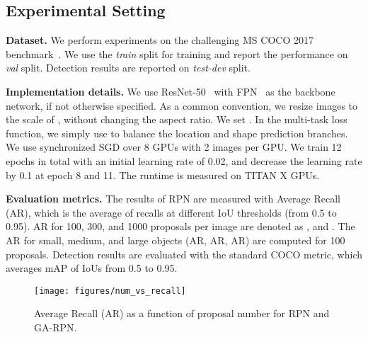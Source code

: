 \documentclass[10pt,twocolumn,letterpaper]{article}
\begin{document}
\subsection{Experimental Setting}

\noindent
\textbf{Dataset.}
We perform experiments on the challenging MS COCO 2017 benchmark~\cite{lin2014microsoft}.
We use the \emph{train} split for training and report the performance
on \emph{val} split. Detection results are reported on \emph{test-dev} split.

\noindent
\textbf{Implementation details.}
We use ResNet-50~\cite{he2016deep} with FPN~\cite{lin2017feature} as the
backbone network, if not otherwise specified.
As a common convention, we resize images to the scale of ,
without changing the aspect ratio.
We set .
In the multi-task loss function, we simply use  to
balance the location and shape prediction branches.
We use synchronized SGD over 8 GPUs with 2 images per GPU.
We train 12 epochs in total with an initial learning rate of 0.02,
and decrease the learning rate by 0.1 at epoch 8 and 11.
The runtime is measured on TITAN X GPUs.

\noindent
\textbf{Evaluation metrics.}
The results of RPN are measured with Average Recall (AR), which is the average
of recalls at different IoU thresholds (from 0.5 to 0.95). AR for 100, 300, and 1000 proposals
per image are denoted as ,  and .
The AR for small, medium, and large objects (AR, AR, AR)
are computed for 100 proposals.
Detection results are evaluated with the standard COCO metric, which averages mAP
of IoUs from 0.5 to 0.95.

\begin{figure}[t]
	\centering
	\texttt{[image: figures/num\_vs\_recall]}
	\caption{Average Recall (AR) as a function of proposal number for RPN and GA-RPN.\color{red}{We consider removing this figure to save space.}}
	\label{fig:num-vs-recall}
\end{figure}
\fi
\end{document}
